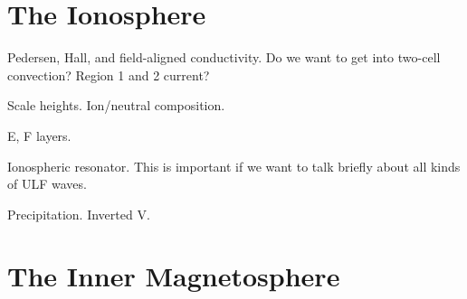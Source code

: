 



\section{The Ionosphere}

Pedersen, Hall, and field-aligned conductivity. Do we want to get into two-cell convection? Region 1 and 2 current? 


Scale heights. Ion/neutral composition. 

E, F layers. 

Ionospheric \Alfven resonator. This is important if we want to talk briefly about all kinds of ULF waves. 

Precipitation. Inverted V. 



\section{The Inner Magnetosphere}


